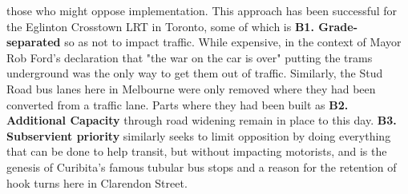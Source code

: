 \documentclass[nobib]{tufte-handout}
\begin{document}
 those who might oppose  implementation.  This approach has been successful for the Eglinton Crosstown LRT in Toronto, some of which is \textbf{B1. Grade-separated} so as not to impact traffic. While expensive, in the context of Mayor Rob Ford's declaration that "the war on the car is over" putting the trams underground was the only way to get them out of traffic. Similarly,  the Stud Road bus lanes here in Melbourne were only removed where they had been converted from a traffic lane. Parts where they had been built as \textbf{B2. Additional Capacity} through road widening remain in place to this day.  \textbf{B3. Subservient priority} similarly seeks to limit opposition  by doing everything that can be done to help transit, but without impacting motorists, and is the genesis of Curibita's famous tubular bus stops and a reason for the retention of hook turns here in Clarendon Street. 
\end{document}

